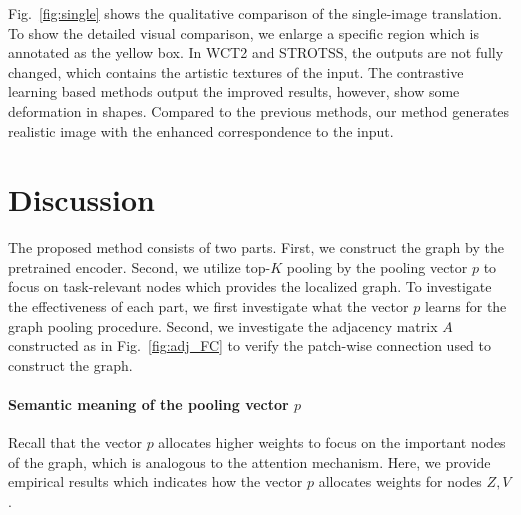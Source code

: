 \documentclass[letterpaper]{article} %
\begin{document}
Fig.~\ref{fig:single} shows the qualitative comparison of the single-image translation. To show the detailed visual comparison, we enlarge a specific region which is annotated as the yellow box. In WCT2 and STROTSS, the outputs are not fully changed, which contains the artistic textures of the input. The contrastive learning based methods output the improved results, however, show some deformation in shapes.
Compared to the previous methods, our method generates realistic image with the enhanced correspondence to the input.

\section{Discussion}

The proposed method consists of two parts. First, we construct the graph by the pretrained encoder. Second, we utilize top-$K$ pooling by the pooling vector $p$ to focus on task-relevant nodes which provides the localized graph.
To investigate the effectiveness of each part, we first investigate what the vector $p$ learns for the graph pooling procedure.
Second, we investigate the adjacency matrix $A$ constructed as in Fig.~\ref{fig:adj_FC}
to verify the patch-wise connection used to construct the graph.

%


\paragraph{Semantic meaning of the pooling vector $p$ }
Recall that the vector $p$ allocates higher weights to focus on the important nodes of the graph, which is analogous to the attention mechanism.
Here, we provide empirical results which indicates how the vector $p$ allocates weights for nodes $Z, V$.
\end{document}
